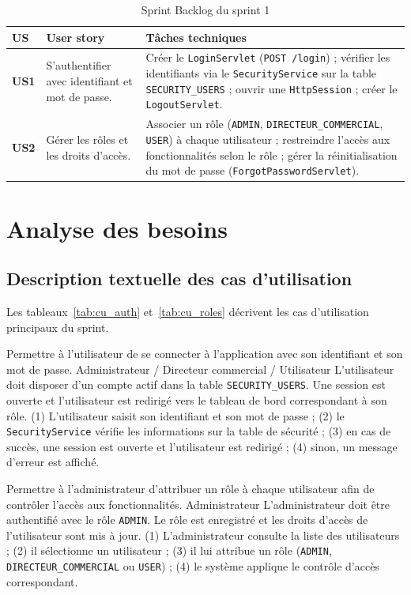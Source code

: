 \begin{table}[htbp]
\centering
\caption{Sprint Backlog du sprint 1}
\label{tab:bl_s1}
\renewcommand{\arraystretch}{1.3}
\begin{tabularx}{\textwidth}{>{\bfseries}p{1cm}p{5.2cm}X}
\toprule
\textmd{\textbf{US}} & \textbf{User story} & \textbf{Tâches techniques}\\
\midrule
US1 & S'authentifier avec identifiant et mot de passe. &
Créer le \texttt{LoginServlet} (\texttt{POST /login}) ; vérifier les identifiants
via le \texttt{SecurityService} sur la table \texttt{SECURITY\_USERS} ; ouvrir une
\texttt{HttpSession} ; créer le \texttt{LogoutServlet}.\\
\midrule
US2 & Gérer les rôles et les droits d'accès. &
Associer un rôle (\texttt{ADMIN}, \texttt{DIRECTEUR\_COMMERCIAL}, \texttt{USER}) à
chaque utilisateur ; restreindre l'accès aux fonctionnalités selon le rôle ;
gérer la réinitialisation du mot de passe (\texttt{ForgotPasswordServlet}).\\
\bottomrule
\end{tabularx}
\end{table}

\section{Analyse des besoins}

\subsection{Description textuelle des cas d'utilisation}
Les tableaux~\ref{tab:cu_auth} et~\ref{tab:cu_roles} décrivent les cas
d'utilisation principaux du sprint.

{Permettre à l'utilisateur de se connecter à l'application avec son identifiant et
son mot de passe.}
{Administrateur / Directeur commercial / Utilisateur}
{L'utilisateur doit disposer d'un compte actif dans la table \texttt{SECURITY\_USERS}.}
{Une session est ouverte et l'utilisateur est redirigé vers le tableau de bord
correspondant à son rôle.}
{(1) L'utilisateur saisit son identifiant et son mot de passe ; (2) le
\texttt{SecurityService} vérifie les informations sur la table de sécurité ; (3) en
cas de succès, une session est ouverte et l'utilisateur est redirigé ; (4) sinon,
un message d'erreur est affiché.}

{Permettre à l'administrateur d'attribuer un rôle à chaque utilisateur afin de
contrôler l'accès aux fonctionnalités.}
{Administrateur}
{L'administrateur doit être authentifié avec le rôle \texttt{ADMIN}.}
{Le rôle est enregistré et les droits d'accès de l'utilisateur sont mis à jour.}
{(1) L'administrateur consulte la liste des utilisateurs ; (2) il sélectionne un
utilisateur ; (3) il lui attribue un rôle (\texttt{ADMIN},
\texttt{DIRECTEUR\_COMMERCIAL} ou \texttt{USER}) ; (4) le système applique le
contrôle d'accès correspondant.}

